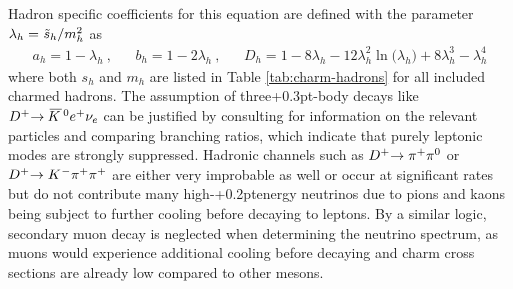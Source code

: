 Hadron specific coefficients for this equation are defined with the parameter
$\lambda_h = \kern+0.5pt \tilde{s}_h / m_h^2 \kern+0.2pt$ as
\begin{align*}
	a_h = 1 - \lambda_h \: , && b_h = 1 - 2\lambda_h \: , &&
	D_h = 1 - 8 \lambda_h - 12\lambda_h^2 \ln \bigl( \lambda_h \bigr) + 8 \lambda_h^3 - \lambda_h^4
\end{align*}
where both $s_h$ and $m_h$ are listed in Table \ref{tab:charm-hadrons} for all included charmed hadrons. The assumption of
three{\kern+0.3pt}-body decays like $D^+ \kern-2.5pt \rightarrow \kern+1.0pt \overline{\kern-1.5pt K \kern+1.0pt}\kern+1.0pt^0 e^+ \nu_e$
can be justified by consulting \cite{pdg} for information on the relevant particles and comparing branching ratios, which indicate
that purely leptonic modes are strongly suppressed. Hadronic channels such as $D^+ \kern-2.5pt \rightarrow \pi^+ \pi^0$ or
$D^+ \kern-2.5pt \rightarrow K^{\kern+0.5pt -} \pi^+ \pi^+$ are either very improbable as well or occur at significant rates but
do not contribute many high-{\kern+0.2pt}energy neutrinos due to pions and kaons being subject to further cooling before decaying
to leptons. By a similar logic, secondary muon decay is neglected when determining the neutrino spectrum, as muons would experience
additional cooling before decaying and charm cross sections are already low compared to other mesons.

\newpage

